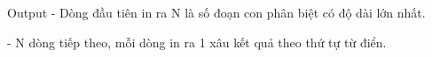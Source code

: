 Output
- Dòng đầu tiên in ra N là số đoạn con phân biệt có độ dài lớn nhất.  

   - N dòng tiếp theo, mỗi dòng in ra 1 xâu kết quả theo thứ tự từ điển.
